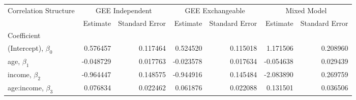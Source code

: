 \begin{tabular}{lrrrrrr}
\toprule
Correlation Structure & \multicolumn{2}{c}{GEE Independent} & \multicolumn{2}{c}{GEE Exchangeable} & \multicolumn{2}{c}{Mixed Model} \\
{} &        Estimate & Standard Error &         Estimate & Standard Error &    Estimate & Standard Error \\
Coefficient            &                 &                &                  &                &             &                \\
\midrule
(Intercept), $\beta_0$ &        0.576457 &       0.117464 &         0.524520 &       0.115018 &    1.171506 &       0.208960 \\
age, $\beta_1$         &       -0.048729 &       0.017763 &        -0.023578 &       0.017634 &   -0.054638 &       0.029439 \\
income, $\beta_2$      &       -0.964447 &       0.148575 &        -0.944916 &       0.145484 &   -2.083890 &       0.269759 \\
age:income, $\beta_3$  &        0.076834 &       0.022462 &         0.061876 &       0.022088 &    0.131501 &       0.036506 \\
\bottomrule
\end{tabular}
